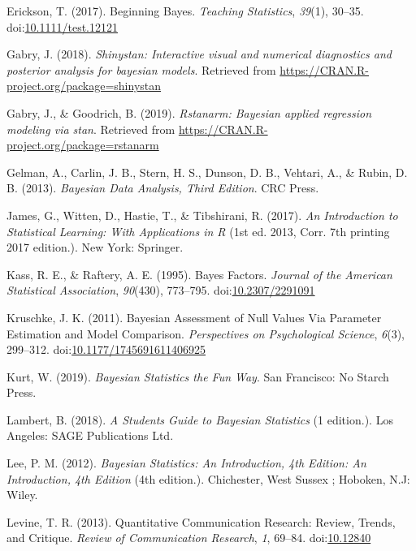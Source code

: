 \documentclass[doc]{apa6}
\begin{document}
\hypertarget{ref-EricksonBeginningBayes2017}{}
Erickson, T. (2017). Beginning Bayes. \emph{Teaching Statistics},
\emph{39}(1), 30--35.
doi:\href{https://doi.org/10.1111/test.12121}{10.1111/test.12121}

\hypertarget{ref-R-shinystan}{}
Gabry, J. (2018). \emph{Shinystan: Interactive visual and numerical
diagnostics and posterior analysis for bayesian models}. Retrieved from
\url{https://CRAN.R-project.org/package=shinystan}

\hypertarget{ref-R-rstanarm}{}
Gabry, J., \& Goodrich, B. (2019). \emph{Rstanarm: Bayesian applied
regression modeling via stan}. Retrieved from
\url{https://CRAN.R-project.org/package=rstanarm}

\hypertarget{ref-GelmanBayesianDataAnalysis2013}{}
Gelman, A., Carlin, J. B., Stern, H. S., Dunson, D. B., Vehtari, A., \&
Rubin, D. B. (2013). \emph{Bayesian Data Analysis, Third Edition}. CRC
Press.

\hypertarget{ref-JamesIntroductionStatisticalLearning2017}{}
James, G., Witten, D., Hastie, T., \& Tibshirani, R. (2017). \emph{An
Introduction to Statistical Learning: With Applications in R} (1st ed.
2013, Corr. 7th printing 2017 edition.). New York: Springer.

\hypertarget{ref-kassBayesFactors1995}{}
Kass, R. E., \& Raftery, A. E. (1995). Bayes Factors. \emph{Journal of
the American Statistical Association}, \emph{90}(430), 773--795.
doi:\href{https://doi.org/10.2307/2291091}{10.2307/2291091}

\hypertarget{ref-kruschkeBayesianAssessmentNull2011}{}
Kruschke, J. K. (2011). Bayesian Assessment of Null Values Via Parameter
Estimation and Model Comparison. \emph{Perspectives on Psychological
Science}, \emph{6}(3), 299--312.
doi:\href{https://doi.org/10.1177/1745691611406925}{10.1177/1745691611406925}

\hypertarget{ref-kurtBayesianStatisticsFun2019}{}
Kurt, W. (2019). \emph{Bayesian Statistics the Fun Way}. San Francisco:
No Starch Press.

\hypertarget{ref-lambertStudentsGuideBayesian2018}{}
Lambert, B. (2018). \emph{A Students Guide to Bayesian Statistics} (1
edition.). Los Angeles: SAGE Publications Ltd.

\hypertarget{ref-leeBayesianStatisticsIntroduction2012}{}
Lee, P. M. (2012). \emph{Bayesian Statistics: An Introduction, 4th
Edition: An Introduction, 4th Edition} (4th edition.). Chichester, West
Sussex ; Hoboken, N.J: Wiley.

\hypertarget{ref-LevineQuantitativeCommunicationResearch2013}{}
Levine, T. R. (2013). Quantitative Communication Research: Review,
Trends, and Critique. \emph{Review of Communication Research}, \emph{1},
69--84. doi:\href{https://doi.org/10.12840}{10.12840}
\end{document}
